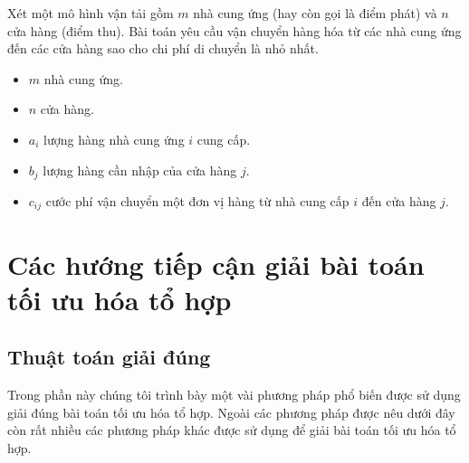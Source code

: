 \documentclass[a4paper,12pt]{report}
\begin{document}
Xét một mô hình vận tải gồm $m$ nhà cung ứng (hay còn gọi là điểm phát) và $n$ cửa hàng (điểm thu). Bài toán yêu cầu vận chuyển hàng hóa từ các  nhà cung ứng đến các cửa hàng sao cho chi phí di chuyển là nhỏ nhất.
\begin{itemize}
\item  $m$ nhà cung ứng.
\item  $n$ cửa hàng.
\item  $a_i$ lượng hàng nhà cung ứng $i$ cung cấp.
\item  $b_j$ lượng hàng cần nhập của cửa hàng $j$.
\item  $c_{ij}$ cước phí vận chuyển một đơn vị hàng từ nhà cung cấp $i$ đến cửa hàng $j$.\cite{TUHTT}
\end{itemize}
\begin {center}
\end{center}
\section{Các hướng tiếp cận giải bài toán tối ưu hóa tổ hợp}
\label{section:cbs}
\subsection{Thuật toán giải đúng}
Trong phần này chúng tôi trình bày một vài phương pháp phổ biến được sử dụng giải đúng bài toán tối ưu hóa tổ hợp. Ngoài các phương pháp được nêu dưới đây còn rất nhiều các phương pháp khác được sử dụng để giải bài toán tối ưu hóa tổ hợp.
\end{document}
